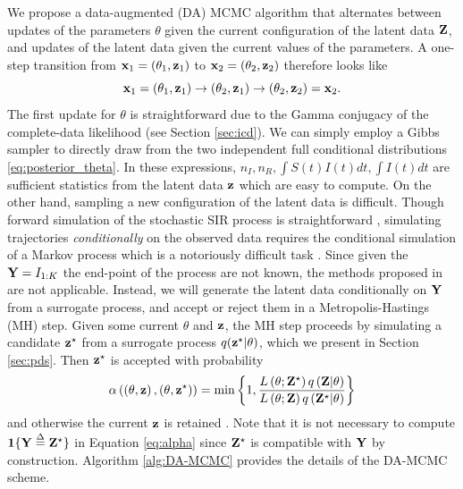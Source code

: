 \documentclass[11pt]{article}
\newcommand{\ram}[1]{{\color{green}{ #1}}}
\begin{document}
	We propose a data-augmented (DA) MCMC algorithm that alternates between updates of the parameters $\theta$ given the current configuration of the latent data $\mathbf{Z}$, and updates of the latent data given the current values of the parameters. A one-step transition from $\mathbf{x}_1 = (\theta_1, \mathbf{z}_1)$ to $\mathbf{x}_2 = (\theta_2, \mathbf{z}_2)$ therefore looks like
	$$\mathbf{x}_1 = (\theta_1, \mathbf{z}_1) \rightarrow (\theta_2, \mathbf{z}_1) \rightarrow (\theta_2, \mathbf{z}_2) = \mathbf{x}_2.$$
	The first update for $\theta$ is straightforward due to the Gamma conjugacy of the complete-data likelihood (see Section \ref{sec:icd}). We can simply employ a Gibbs sampler to directly draw from the two independent full conditional distributions \ref{eq:posterior_theta}. In these expressions, $n_I, n_R, \int S(t)I(t) dt, \int I(t) dt$ are sufficient statistics from the latent data $\mathbf{z}$ which are easy to compute. 
	On the other hand, sampling a new configuration of the latent data is difficult. Though forward simulation of the stochastic SIR process is straightforward \ram{ref: Gillepsie}, simulating trajectories \textit{conditionally} on the observed data requires the conditional simulation of a Markov process which is a notoriously difficult task \cite{Hobolth.2009}. Since given the $\mathbf{Y} = I_{1:K}$ the end-point of the process are not known, the methods proposed in \cite{Hobolth.2009} are not applicable.
	Instead, we will generate the latent data conditionally on $\mathbf{Y}$ from a surrogate process, and accept or reject them in a Metropolis-Hastings (MH) step. Given some current $\theta$ and $\mathbf{z}$, the MH step proceeds by simulating a candidate $\mathbf{z}^\star$ from a surrogate process $q(\mathbf{z}^\star|\theta)$, which we present in Section \ref{sec:pds}. Then $\mathbf{z}^\star$ is accepted with probability
	\begin{equation}
		\label{eq:alpha}
		\alpha\left( \left( \theta, \mathbf{z}\right) , \left( \theta, \mathbf{z}^\star\right) \right) =	\min\left\lbrace 1, \dfrac{L\left( \theta; \mathbf{Z}^\star\right) q\left( \mathbf{Z}|\theta\right)}{L\left( \theta;\mathbf{Z}\right) q\left( \mathbf{Z}^\star|\theta\right)}\right\rbrace
	\end{equation}
	and otherwise the current $\mathbf{z}$ is retained \cite{Tierney.1994}. Note that it is not necessary to compute $\mathbf{1}\{\mathbf{Y} \overset{\Delta}{=} \mathbf{Z}^\star\}$ in Equation \ref{eq:alpha} since $\mathbf{Z}^\star$ is compatible with $\mathbf{Y}$ by construction. Algorithm \ref{alg:DA-MCMC} provides the details of the DA-MCMC scheme.
	
\end{document}
